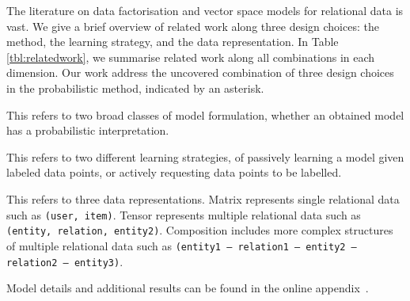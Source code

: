
The literature on data factorisation and vector space models for
relational data is vast.
We give a brief overview of related work along three design choices:
the method, the learning strategy, and the data representation.
In Table \ref{tbl:relatedwork}, we summarise related work along all combinations in each dimension.
Our work address the uncovered combination of three design choices in the probabilistic method, indicated by an asterisk.

 This refers to two broad classes of model
formulation, whether an obtained model has a probabilistic interpretation.

 This refers to two different learning strategies,
of passively learning a model given labeled data points, or actively
requesting data points to be labelled.

 This refers to three data representations. Matrix represents single relational data such as \texttt{(user, item)}.
Tensor represents multiple relational data such as \texttt{(entity, relation, entity2)}.
Composition includes more complex structures of multiple relational data such as \texttt{(entity1 -- relation1 -- entity2 -- relation2 -- entity3)}. 

Model details and additional results can be found in the online appendix~\cite{kim2016probabilistic}. 


